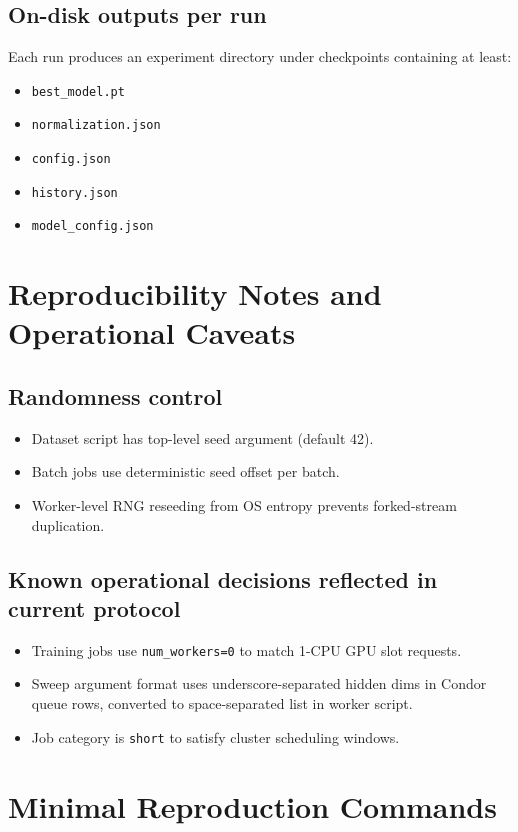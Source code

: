 \documentclass[11pt,a4paper]{article}
\begin{document}
\subsection{On-disk outputs per run}
Each run produces an experiment directory under checkpoints containing at least:
\begin{itemize}[leftmargin=*]
  \item \texttt{best\_model.pt}
  \item \texttt{normalization.json}
  \item \texttt{config.json}
  \item \texttt{history.json}
  \item \texttt{model\_config.json}
\end{itemize}

\section{Reproducibility Notes and Operational Caveats}
\subsection{Randomness control}
\begin{itemize}[leftmargin=*]
  \item Dataset script has top-level seed argument (default 42).
  \item Batch jobs use deterministic seed offset per batch.
  \item Worker-level RNG reseeding from OS entropy prevents forked-stream duplication.
\end{itemize}

\subsection{Known operational decisions reflected in current protocol}
\begin{itemize}[leftmargin=*]
  \item Training jobs use \texttt{num\_workers=0} to match 1-CPU GPU slot requests.
  \item Sweep argument format uses underscore-separated hidden dims in Condor queue rows, converted to space-separated list in worker script.
  \item Job category is \texttt{short} to satisfy cluster scheduling windows.
\end{itemize}

\section{Minimal Reproduction Commands}
\end{document}
